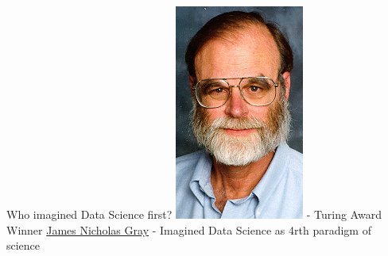 \begin{frame}{Who imagined Data Science first?}
\protect\hypertarget{who-imagined-data-science-first}{}
\includegraphics{images/JamesGray.gif} - Turing Award Winner
\href{https://en.wikipedia.org/wiki/Jim_Gray_(computer_scientist)}{James
Nicholas Gray} - Imagined Data Science as 4rth paradigm of science
\end{frame}

